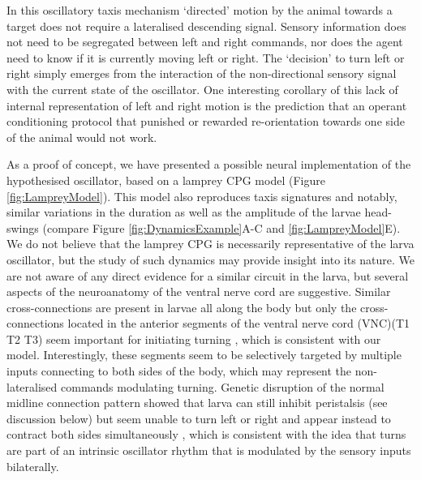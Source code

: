 \documentclass[11pt,a4paper]{article}
\newcommand{\todoBW}[1]{\todo[author=BW,color=orange, size=\tiny,inline]{#1}}
\begin{document}
In this oscillatory taxis mechanism ‘directed’ motion by the animal towards a target does not require a lateralised descending signal. Sensory information does not need to be segregated between left and right commands, nor does the agent need to know if it is currently moving left or right. The ‘decision’ to turn left or right simply emerges from the interaction of the non-directional sensory signal with the current state of the oscillator. 
One interesting corollary of this lack of internal representation of left and right motion is the prediction that an operant conditioning protocol that punished or rewarded re-orientation towards one side of the animal would not work.

As a proof of concept, we have presented a possible neural implementation of the hypothesised oscillator, based on a lamprey CPG model (Figure \ref{fig:LampreyModel}).
 This model also reproduces taxis signatures and notably, similar variations in the duration as well as the amplitude of the larvae head-swings (compare Figure \ref{fig:DynamicsExample}A-C and \ref{fig:LampreyModel}E).
  We do not believe that the lamprey CPG is necessarily representative of the larva oscillator, but the study of such dynamics may provide insight into its nature.
  We are not aware of any direct evidence for a similar circuit in the larva, but several aspects of the neuroanatomy of the ventral nerve cord are suggestive. Similar cross-connections are present in larvae all along the body \citep{rickert2011morphological}
  but only the cross-connections located in the anterior segments of the ventral nerve cord (VNC)(T1 T2 T3) seem important for initiating turning \citep{ berni2015genetic}, which is consistent with our model. Interestingly, these segments seem to be selectively targeted by multiple inputs connecting to both sides of the body, which may represent the non-lateralised commands modulating turning. Genetic disruption of the normal midline connection pattern showed that larva can still inhibit peristalsis (see discussion below) but seem unable to turn left or right and appear instead to contract both sides simultaneously \citep{berni2015genetic}, which is consistent with the idea that turns are part of an intrinsic oscillator rhythm that is modulated by the sensory inputs bilaterally.
\end{document}
